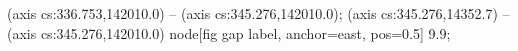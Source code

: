  (axis cs:336.753,142010.0) -- (axis cs:345.276,142010.0);
 (axis cs:345.276,14352.7) -- (axis cs:345.276,142010.0)
  node[fig gap label, anchor=east, pos=0.5] {\texttimes{}9.9};
